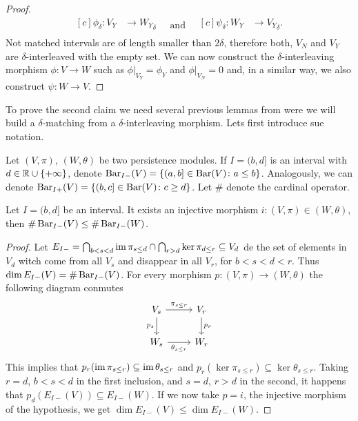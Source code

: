 \begin{proof}
\begin{equation*}
\begin{aligned}[c]
        \phi_\delta\colon V_Y &\to {W_Y}_\delta\\
        \end{aligned}
        \quad \text{and} \quad
        \begin{aligned}[c]
        \psi_\delta\colon W_Y &\to {V_Y}_\delta.\\
        \end{aligned}
    \end{equation*}
    Not matched intervals are of length smaller than $ 2 \delta $, therefore both, $V_N$ and $V_Y$ are $\delta$-interleaved with the empty set. We can now construct the $\delta$-interleaving morphism $ \phi\colon V \to W$ such as $\phi \vert_{V_Y} = \phi_Y$ and $\phi \vert_{V_N} = 0$ and, in a similar way, we also construct $ \psi\colon W \to V$.
\end{proof}

To prove the second claim we need several previous lemmas from were we will build a $\delta$-matching from a $\delta$-interleaving morphism. Lets first introduce sue notation.

Let $(V, \pi)$, $(W, \theta)$ be two persistence modules. If $ I = (b, d]$ is an interval with $ d \in \mathbb R \cup \{+ \infty\}$, denote $ \operatorname{Bar}_{I-}(V) = \left\{ (a, b] \in \operatorname{Bar}(V) \colon a \leq b\right\}$. Analogously, we can denote $ \operatorname{Bar}_{I+}(V) = \left\{ (b, c] \in \operatorname{Bar}(V) \colon c \geq d\right\}$. Let $ \# $ denote the cardinal operator.

\begin{lemma}  \cite[Proposition 3.1.1]{polterovich} \label{lemma:inj-cardinalities}
    Let $ I = (b, d] $ be an interval. It exists an injective morphism $i\colon (V, \pi) \in (W, \theta) $, then $\# \operatorname{Bar}_{I-}(V) \leq \# \operatorname{Bar}_{I-}(W) $.
\end{lemma}
\begin{proof}
    Let $ E_{I-} = \bigcap_{b < s < d} \operatorname{im} \pi_{s\leq d} \cap \bigcap_{r> d} \ker \pi_{d \leq r} \subseteq V_d $ de the set of elements in $ V_d $ witch come from all $ V_s $ and disappear in all $ V_r $, for $ b < s < d < r $. Thus $ \dim E_{I-}(V) = \# \operatorname{Bar}_{I-}(V) $. For every morphism $ p\colon (V, \pi) \to (W, \theta) $ the following diagram conmutes
    $$
    \begin{tikzcd}
        V_s \arrow[r, "\pi_{s \leq r}"] \arrow[d, "p_s"'] & V_r \arrow[d, "p_r"] \\
        W_s \arrow[r, "\theta_{s \leq r}"']               & W_r
    \end{tikzcd}
    $$
    This implies that $ p_r(\operatorname{im} \pi_{s \leq r}) \subseteq \operatorname{im} \theta_{s \leq r} $ and $ p_r(\ker \pi_{s \leq r}) \subseteq \ker \theta_{s \leq r} $. Taking $ r = d $, $ b < s < d $ in the first inclusion, and $ s = d $, $ r > d $ in the second, it happens that $ p_d(E_{I-}(V)) \subseteq E_{I-}(W) $. If we now take $ p = i $, the injective morphism of the hypothesis, we get $ \dim E_{I-}(V) \leq \dim E_{I-}(W)$.
\end{proof}
 
